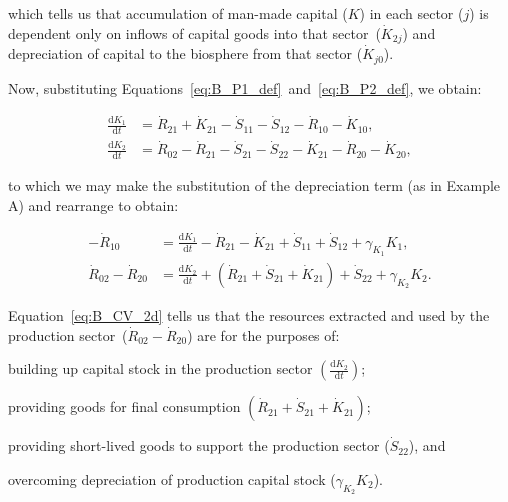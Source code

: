 \noindent{}which tells us that accumulation 
of man-made capital ($K$) in each sector ($j$)
is dependent only on inflows of capital goods 
into that sector~($\dot{K}_{2j}$) and 
depreciation of capital to the biosphere 
from that sector ($\dot{K}_{j0}$).

Now, substituting
Equations~\ref{eq:B_P1_def}~and~\ref{eq:B_P2_def},
we obtain:

\begin{align} 
\label{eq:B_CV_1c}
	 \frac{\mathrm{d}K_{1}}{\mathrm{d}t}	&
	=  \dot{R}_{21}
	+ \dot{K}_{21}
	- \dot{S}_{11}
	- \dot{S}_{12} 
	- \dot{R}_{10} 
	- \dot{K}_{10},							\\
\label{eq:B_CV_2c}
	\frac{\mathrm{d}K_{2}}{\mathrm{d}t}	&
	=  \dot{R}_{02} 
	- \dot{R}_{21}
	- \dot{S}_{21}
	- \dot{S}_{22}
	- \dot{K}_{21}	 
	- \dot{R}_{20} 
	- \dot{K}_{20},
\end{align}

\noindent{}to which we may make the 
substitution of the depreciation term 
(as in Example A) and rearrange 
to obtain:

\begin{align} 
\label{eq:B_CV_1d}
	- \dot{R}_{10} 	 										&
	 = \frac{\mathrm{d}K_{1}}{\mathrm{d}t}
	-  \dot{R}_{21}
	- \dot{K}_{21}
	+ \dot{S}_{11}
	+ \dot{S}_{12} 
	+ \gamma_{K_{1}}K_{1},											\\
\label{eq:B_CV_2d}
	\dot{R}_{02}
	- \dot{R}_{20} 											&
	= \frac{\mathrm{d}K_{2}}{\mathrm{d}t}	
	+ \left(\dot{R}_{21}
	+ \dot{S}_{21}
	+ \dot{K}_{21}\right)	 
	+ \dot{S}_{22}
	+ \gamma_{K_{2}}K_{2}.
\end{align}

Equation~\ref{eq:B_CV_2d} tells us that 
the resources extracted and used by 
the production sector~($\dot{R}_{02} - \dot{R}_{20}$)
are for the purposes of: 

\begin{itemize}
	\item{building up capital stock
	in the production sector
	$\left(\frac{\mathrm{d}K_{2}}{\mathrm{d}t}\right)$;}
	\item{providing goods 
	for final consumption
	$\left(\dot{R}_{21}
	+ \dot{S}_{21}
	+ \dot{K}_{21}\right)	$;}
	\item{providing short-lived goods
	to support the 
	production sector ($\dot{S}_{22}$), and
	\item overcoming depreciation of production 
	capital stock ($\gamma_{K_{2}}K_{2}$).}
\end{itemize}

